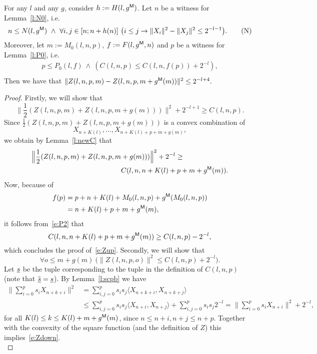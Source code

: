 \begin{lemma}\label{l:Zs}
For any $l$ and any $g$, consider $h:= H(l,g\protect{^{\textsf{\upshape M}}})$. Let
$n$ be a witness for Lemma~\ref{l:N0}, i.e. 
\[
n\leq N(l,g\powM)\ \wedge\ \forall i,j\in[n;n+h(n)]\ 
\big( i\leq j\rightarrow \|X_i\|^2-\|X_j\|^2\leq 2^{-l-1} \big) . \tag{N} 
\]
Moreover, let $m:=M_0(l,n,p)$, $f:=F(l,g\protect{^{\textsf{\upshape M}}},n)$ and 
$p$ be a witness for Lemma~\ref{l:P0}, i.e. 
\begin{align*}
p\leq P_0(l,f)\ \wedge\ ( C(l,n,p)\leq C(l,n,f(p)) + 2^{-l}  ),  \tag{P}\label{e:P2}\\
\end{align*} 
Then we have that
$ \|Z(l,n,p,m) - Z( l,n,p,m+g\protect{^{\textsf{\upshape M}}}(m) ) \|^2 \leq 2^{-l+4}.$
\end{lemma}
\begin{proof}
Firstly, we will show that
\[
\|\frac{1}{2}( Z(l,n,p,m) + Z( l,n,p,m+g(m) )  )\|^2 + 2^{-l+1} \geq C(l,n,p). \tag{1}\label{e:Zup}
\]
Since $\frac{1}{2}( Z(l,n,p,m) + Z( l,n,p,m+g(m) )  )$ is a convex
combination of \[ X_{n+K(l)},\ldots,X_{n+K(l)+p+m+g(m)},\] 
we obtain by Lemma~\ref{l:newC} that
\begin{align*}
\Big\|\frac{1}{2}( Z(l,n,p,m) + Z( l,n,p,m&+g(m) )  )\Big\|^2 + 2^{-l} \geq\\ &C( l,n,n+K(l)+p+m+g\protect{^{\textsf{\upshape M}}}(m) ). 
\end{align*}
Now, because of 
\begin{align*}
f(p)&=p+n+K(l)+M_0(l,n,p)+g\protect{^{\textsf{\upshape M}}}(M_0(l,n,p))\\&=n+K(l)+p+m+g\protect{^{\textsf{\upshape M}}}(m), 
\end{align*}
it follows from~\eqref{e:P2} that
\[
 C( l,n,n+K(l)+p+m+g\powM(m) ) \geq  C(l,n,p) - 2^{-l}, %
\]
which concludes the proof of~\eqref{e:Zup}.
Secondly, we will show that \[
\forall o\leq m+g(m)\ \big( \big\| Z( l,n,p,o ) \big\|^2\leq C(l,n,p) + 2^{-l} \big). \tag{2}\label{e:Zdown}
\] 
Let $\underline s$ be the tuple corresponding to the tuple in the definition of $C(l,n,p)$ (note that $\tilde{\underline s}=\underline s$).
By Lemma~\ref{l:scpb} we have
\begin{align*}
\bigg\|\sum^{p}_{i=0} s_i X_{n+k+i}\bigg\|^2&=\sum^{p}_{i,j=0}  s_i s_j \langle X_{n+k+i},X_{n+k+j} \rangle \\
&\leq \sum^{p}_{i,j=0}  s_i s_j \langle X_{n+i},X_{n+j} \rangle + \sum^{p}_{i,j=0}  s_i s_j 2^{-l}=\bigg\|\sum^{p}_{i=0} s_i X_{n+i}\bigg\|^2+2^{-l},
\end{align*}
for all $K(l)\leq k \leq K(l)+m+g\protect{^{\textsf{\upshape M}}}(m)$, since $n\leq n+i,n+j\leq n+p$. Together with the convexity of the square function (and the definition of $Z$) this implies~\eqref{e:Zdown}.\\

\end{proof}
